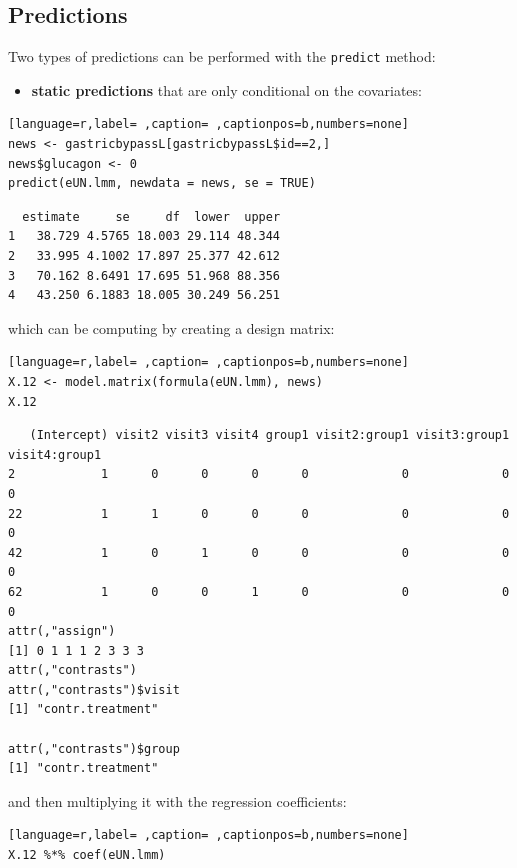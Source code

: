 \documentclass[12pt]{article}
\begin{document}
\clearpage

\subsection{Predictions}
\label{sec:org544d226}

Two types of predictions can be performed with the \texttt{predict} method:
\begin{itemize}
\item \textbf{static predictions} that are only conditional on the covariates:
\end{itemize}
\begin{lstlisting}[language=r,label= ,caption= ,captionpos=b,numbers=none]
news <- gastricbypassL[gastricbypassL$id==2,]
news$glucagon <- 0
predict(eUN.lmm, newdata = news, se = TRUE)
\end{lstlisting}

\begin{verbatim}
  estimate     se     df  lower  upper
1   38.729 4.5765 18.003 29.114 48.344
2   33.995 4.1002 17.897 25.377 42.612
3   70.162 8.6491 17.695 51.968 88.356
4   43.250 6.1883 18.005 30.249 56.251
\end{verbatim}


which can be computing by creating a design matrix:
\begin{lstlisting}[language=r,label= ,caption= ,captionpos=b,numbers=none]
X.12 <- model.matrix(formula(eUN.lmm), news)
X.12
\end{lstlisting}

\begin{verbatim}
   (Intercept) visit2 visit3 visit4 group1 visit2:group1 visit3:group1 visit4:group1
2            1      0      0      0      0             0             0             0
22           1      1      0      0      0             0             0             0
42           1      0      1      0      0             0             0             0
62           1      0      0      1      0             0             0             0
attr(,"assign")
[1] 0 1 1 1 2 3 3 3
attr(,"contrasts")
attr(,"contrasts")$visit
[1] "contr.treatment"

attr(,"contrasts")$group
[1] "contr.treatment"
\end{verbatim}

and then multiplying it with the regression coefficients:
\begin{lstlisting}[language=r,label= ,caption= ,captionpos=b,numbers=none]
X.12 %*% coef(eUN.lmm)
\end{lstlisting}
\end{document}

